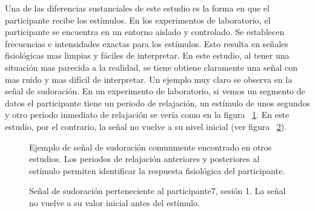 Una de las diferencias sustanciales de este estudio es la forma en que el participante recibe los est\'imulos. En los experimentos de laboratorio, el participante se encuentra en un entorno aislado y controlado. Se establecen frecuencias e intensidades exactas para los est\'imulos. Esto resulta en se\~nales fisiol\'ogicas mas limpias y f\'aciles de interpretar. En este estudio, al tener una situaci\'on mas parecida a la realidad, se tiene obtiene claramente una se\~nal con mas ruido y mas dif\'icil de interpretar. Un ejemplo muy claro se observa en la se\~nal de sudoraci\'on. En un experimento de laboratorio, si vemos un segmento de datos el participante tiene un periodo de relajaci\'on, un est\'imulo de unos segundos y otro periodo inmediato de relajaci\'on se ver\'ia como en la figura ~\ref{fig:gsrsynth}. En este estudio, por el contrario, la se\~nal no vuelve a su nivel inicial (ver figura ~\ref{fig:gsrstudy}). %

\begin{figure}[h!]
        \centering
        \caption{Ejemplo de se\~nal de sudoraci\'on comunmente encontrado en otros estudios. Los periodos de relajaci\'on anteriores y posteriores al est\'imulo permiten identificar la respuesta fisiol\'ogica del participante.}\label{fig:gsrsynth}
\end{figure}
\begin{figure}[h!]
        \centering
        \caption{Se\~nal de sudoraci\'on perteneciente al participante7, sesi\'on 1. La se\~nal no vuelve a su valor inicial antes del est\'imulo.}\label{fig:gsrstudy}
\end{figure}

